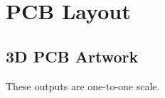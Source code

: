 
\chapter{PCB Layout} %

\label{AppendixB} %



\section{3D PCB Artwork}
	These outputs are one-to-one scale.

